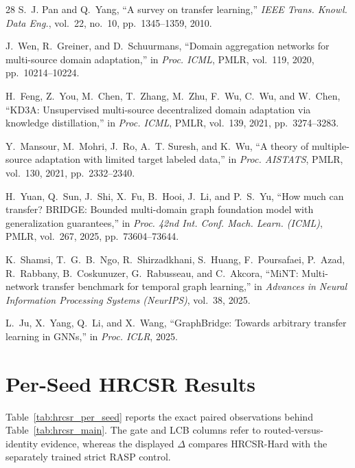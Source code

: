 \documentclass[journal]{IEEEtran}
\begin{document}
\begin{thebibliography}{28}
S.~J. Pan and Q.~Yang,
``A survey on transfer learning,''
\emph{IEEE Trans. Knowl. Data Eng.}, vol.~22, no.~10, pp.~1345--1359, 2010.

J.~Wen, R.~Greiner, and D.~Schuurmans,
``Domain aggregation networks for multi-source domain adaptation,''
in \emph{Proc. ICML}, PMLR, vol.~119, 2020, pp.~10214--10224.

H.~Feng, Z.~You, M.~Chen, T.~Zhang, M.~Zhu, F.~Wu, C.~Wu, and W.~Chen,
``KD3A: Unsupervised multi-source decentralized domain adaptation via knowledge distillation,''
in \emph{Proc. ICML}, PMLR, vol.~139, 2021, pp.~3274--3283.

Y.~Mansour, M.~Mohri, J.~Ro, A.~T. Suresh, and K.~Wu,
``A theory of multiple-source adaptation with limited target labeled data,''
in \emph{Proc. AISTATS}, PMLR, vol.~130, 2021, pp.~2332--2340.

H.~Yuan, Q.~Sun, J.~Shi, X.~Fu, B.~Hooi, J.~Li, and P.~S.~Yu,
``How much can transfer? BRIDGE: Bounded multi-domain graph foundation model with generalization guarantees,''
in \emph{Proc. 42nd Int. Conf. Mach. Learn. (ICML)}, PMLR, vol.~267, 2025, pp.~73604--73644.

K.~Shamsi, T.~G.~B.~Ngo, R.~Shirzadkhani, S.~Huang, F.~Poursafaei, P.~Azad, R.~Rabbany, B.~Coskunuzer, G.~Rabusseau, and C.~Akcora,
``MiNT: Multi-network transfer benchmark for temporal graph learning,''
in \emph{Advances in Neural Information Processing Systems (NeurIPS)}, vol.~38, 2025.

L.~Ju, X.~Yang, Q.~Li, and X.~Wang,
``GraphBridge: Towards arbitrary transfer learning in GNNs,''
in \emph{Proc. ICLR}, 2025.

\end{thebibliography}

\clearpage
\appendices
\section{Per-Seed HRCSR Results}
Table~\ref{tab:hrcsr_per_seed} reports the exact paired observations behind Table~\ref{tab:hrcsr_main}. The gate and LCB columns refer to routed-versus-identity evidence, whereas the displayed $\Delta$ compares HRCSR-Hard with the separately trained strict RASP control.
\end{document}
